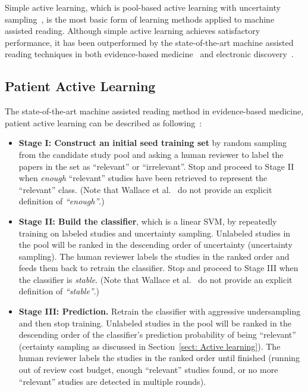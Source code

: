 \documentclass[final,twocolumn,5p]{elsarticle}
\theoremstyle{break}
\begin{document}
Simple active learning, which is pool-based active learning with uncertainty sampling~\cite{settles2012active}, is the most basic form of learning methods
applied to machine assisted reading. Although simple active learning achieves
satisfactory performance, it has been outperformed by the state-of-the-art machine assisted reading techniques in both evidence-based medicine~\cite{wallace2010semi} and electronic discovery~\cite{cormack2014evaluation}. 

\subsection{Patient Active Learning}
\label{sect: Patient Active Learning}

The state-of-the-art machine assisted reading method in evidence-based medicine, patient active learning can be described as following~\cite{wallace2010semi}:

\begin{itemize}

\item
{\bf Stage I: Construct an initial seed training set} by random sampling from the candidate study pool and asking a human reviewer to label the papers in the set as ``relevant'' or ``irrelevant''. Stop and proceed to Stage II when \textit{enough} ``relevant'' studies have been retrieved to represent the ``relevant'' class. (Note that Wallace et al.~\cite{wallace2010semi} do not provide an explicit definition of \textit{``enough''}.)

\item
{\bf Stage II: Build the classifier}, which is a linear SVM, by repeatedly training on labeled studies and uncertainty sampling. Unlabeled studies in the pool will be ranked in the descending order of uncertainty (uncertainty sampling). The human reviewer labels the studies in the ranked order and feeds them back to retrain the classifier. Stop and proceed to Stage III when the classifier is \textit{stable}. (Note that Wallace et al.~\cite{wallace2010semi} do not provide an explicit definition of \textit{``stable''}.)

\item
{\bf Stage III: Prediction.} Retrain the classifier with aggressive undersampling and then stop training. Unlabeled studies in the pool will be ranked in the descending order of the classifier's prediction probability of being ``relevant'' (certainty sampling as discussed in Section~\ref{sect: Active learning}). The human reviewer labels the studies in the ranked order until finished (running out of review cost budget, enough ``relevant'' studies found, or no more ``relevant'' studies are detected in multiple rounds).

\end{itemize}
\end{document}
